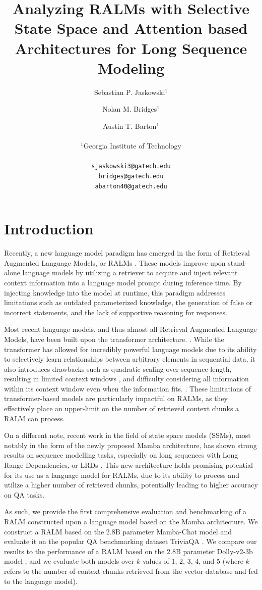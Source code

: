 \documentclass[11pt]{article}
\title{Analyzing RALMs with Selective State Space and Attention based Architectures for Long Sequence Modeling}
\author{Sebastian P. Jaskowski$^1$ \and Nolan M. Bridges$^1$ \and Austin T. Barton$^1$ \\
        \\
         $^1$Georgia Institute of Technology \\ 
         \\ 
         \texttt{sjaskowski3@gatech.edu} \\ \texttt{bridges@gatech.edu} \\
         \texttt{abarton40@gatech.edu} \\}
\begin{document}
\maketitle

\section{Introduction}
Recently, a new language model paradigm has emerged in the form of Retrieval Augmented Language Models, or RALMs \cite{lewis2021retrievalaugmented, gao2024retrievalaugmented}. These models improve upon stand-alone language models by utilizing a retriever to acquire and inject relevant context information into a language model prompt during inference time. By injecting knowledge into the model at runtime, this paradigm addresses limitations such as outdated parameterized knowledge, the generation of false or incorrect statements, and the lack of supportive reasoning for responses. 

Most recent language models, and thus almost all Retrieval Augmented Language Models, have been built upon the transformer architecture. \cite{vaswani2023attention}. While the transformer has allowed for incredibly powerful language models due to its ability to selectively learn relationships between arbitrary elements in sequential data, it also introduces drawbacks such as quadratic scaling over sequence length, resulting in limited context windows \cite{xu2024retrieval}, and difficulty considering all information within its context window even when the information fits. \cite{liu2023lost}. These limitations of transformer-based models are particularly impactful on RALMs, as they effectively place an upper-limit on the number of retrieved context chunks a RALM can process.

On a different note, recent work in the field of state space models (SSMs), most notably in the form of the newly proposed Mamba architecture, has shown strong results on sequence modelling tasks, especially on long sequences with Long Range Dependencies, or LRDs \cite{gu2022, gu2021combining}. This new architecture holds promising potential for its use as a language model for RALMs, due to its ability to process and utilize a higher number of retrieved chunks, potentially leading to higher accuracy on QA tasks.

As such, we provide the first comprehensive evaluation and benchmarking of a RALM constructed upon a language model based on the Mamba architecture. We construct a RALM based on the 2.8B parameter Mamba-Chat model \cite{haven2023mambachat} and evaluate it on the popular QA benchmarking dataset TriviaQA \cite{Joshi2017TriviaQAAL}. We compare our results to the performance of a RALM based on the 2.8B parameter Dolly-v2-3b model \cite{DatabricksBlog2023DollyV2}, and we evaluate both models over $k$ values of 1, 2, 3, 4, and 5 (where $k$ refers to the number of context chunks retrieved from the vector database and fed to the language model).
\end{document}
